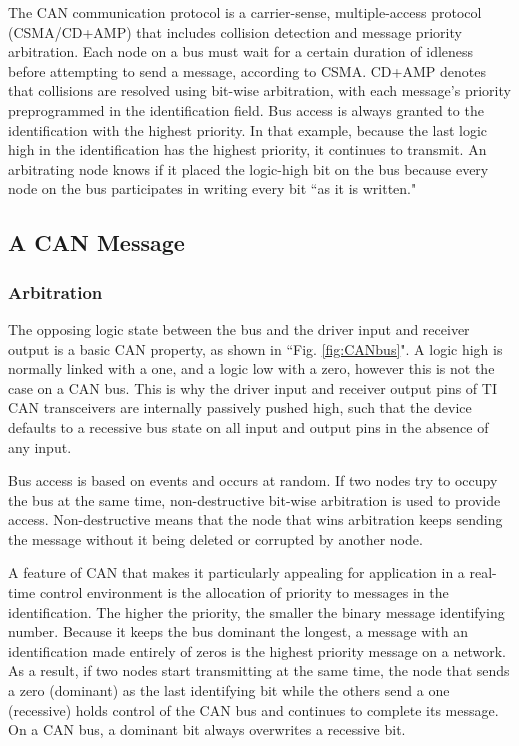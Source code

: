 The CAN communication protocol is a carrier-sense, multiple-access protocol (CSMA/CD+AMP) that includes collision detection and message priority arbitration. Each node on a bus must wait for a certain duration of idleness before attempting to send a message, according to CSMA. CD+AMP denotes that collisions are resolved using bit-wise arbitration, with each message's priority preprogrammed in the identification field. Bus access is always granted to the identification with the highest priority. In that example, because the last logic high in the identification has the highest priority, it continues to transmit. An arbitrating node knows if it placed the logic-high bit on the bus because every node on the bus participates in writing every bit ``as it is written."

\subsection{A CAN Message }
\subsubsection{Arbitration}

The opposing logic state between the bus and the driver input and receiver output is a basic CAN property, as shown in ``Fig. \ref{fig:CANbus}". A logic high is normally linked with a one, and a logic low with a zero, however this is not the case on a CAN bus. This is why the driver input and receiver output pins of TI CAN transceivers are internally passively pushed high, such that the device defaults to a recessive bus state on all input and output pins in the absence of any input.

Bus access is based on events and occurs at random. If two nodes try to occupy the bus at the same time, non-destructive bit-wise arbitration is used to provide access. Non-destructive means that the node that wins arbitration keeps sending the message without it being deleted or corrupted by another node.

A feature of CAN that makes it particularly appealing for application in a real-time control environment is the allocation of priority to messages in the identification. The higher the priority, the smaller the binary message identifying number. Because it keeps the bus dominant the longest, a message with an identification made entirely of zeros is the highest priority message on a network. As a result, if two nodes start transmitting at the same time, the node that sends a zero (dominant) as the last identifying bit while the others send a one (recessive) holds control of the CAN bus and continues to complete its message. On a CAN bus, a dominant bit always overwrites a recessive bit.

